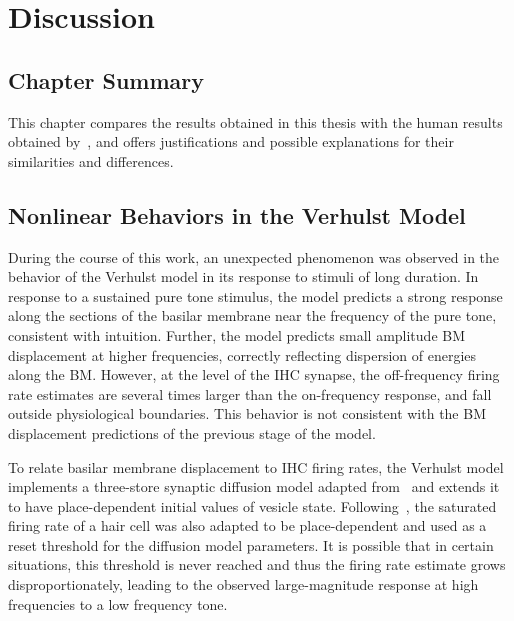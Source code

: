 \chapter{Discussion}
\label{chapter:Discussion}
\thispagestyle{myheadings}

\graphicspath{{6_Discussion/Figures/}}
\section{Chapter Summary} %
\label{sec:discussion_summary}
This chapter compares the results obtained in this thesis with the human results obtained by~\cite{Mehraei2016Auditory}, and offers justifications and possible explanations for their similarities and differences.
\section{Nonlinear Behaviors in the Verhulst Model} %
\label{sec:nonlinear_behaviors_in_the_verhulst_model}
During the course of this work, an unexpected phenomenon was observed in the behavior of the Verhulst model in its response to stimuli of long duration.  In response to a sustained pure tone stimulus, the model predicts a strong response along the sections of the basilar membrane near the frequency of the pure tone, consistent with intuition. Further, the model predicts small amplitude BM displacement at higher frequencies, correctly reflecting dispersion of energies along the BM. However, at the level of the IHC synapse, the off-frequency firing rate estimates are several times larger than the on-frequency response, and fall outside physiological boundaries. This behavior is not consistent with the BM displacement predictions of the previous stage of the model.  

To relate basilar membrane displacement to IHC firing rates, the Verhulst model implements a three-store synaptic diffusion model adapted from~\cite{Westerman1988Diffusion} and extends it to have place-dependent initial values of vesicle state.   Following~\cite{Liberman1978AuditoryNerve}, the saturated firing rate of a hair cell was also adapted to be place-dependent and used as a reset threshold for the diffusion model parameters.  It is possible that in certain situations, this threshold is never reached and thus the firing rate estimate grows disproportionately, leading to the observed large-magnitude response at high frequencies to a low frequency tone.

